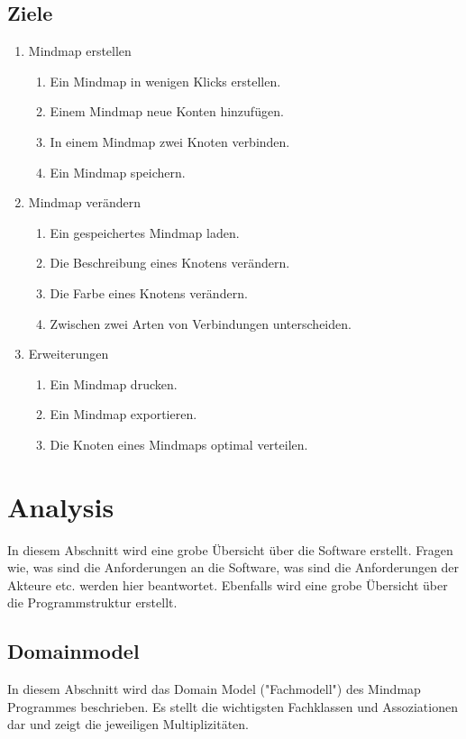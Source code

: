 \documentclass[a4paper,parskip]{scrartcl}
\begin{document}
\subsection{Ziele}
\begin{enumerate}
\item Mindmap erstellen
	\begin{enumerate}
	\item Ein Mindmap in wenigen Klicks erstellen.
	\item Einem Mindmap neue Konten hinzufügen.
	\item In einem Mindmap zwei Knoten verbinden.
	\item Ein Mindmap speichern.
	\end{enumerate}
\item Mindmap verändern
	\begin{enumerate}
	\item Ein gespeichertes Mindmap laden.
	\item Die Beschreibung eines Knotens verändern.
	\item Die Farbe eines Knotens verändern.
	\item Zwischen zwei Arten von Verbindungen unterscheiden.
	\end{enumerate}
\item Erweiterungen
	\begin{enumerate}
	\item Ein Mindmap drucken.
	\item Ein Mindmap exportieren.
	\item Die Knoten eines Mindmaps optimal verteilen.
	\end{enumerate}
\end{enumerate}
\section{Analysis}
In diesem Abschnitt wird eine grobe Übersicht über die Software erstellt. Fragen wie, was sind die Anforderungen an die Software, was sind die Anforderungen der Akteure etc. werden hier beantwortet. Ebenfalls wird eine grobe Übersicht über die Programmstruktur erstellt.
\subsection{Domainmodel}
In diesem Abschnitt wird das Domain Model ("{}Fachmodell"{}) des Mindmap Programmes beschrieben. Es stellt die 
wichtigsten Fachklassen und Assoziationen dar und zeigt die jeweiligen Multiplizitäten.
\end{document}
